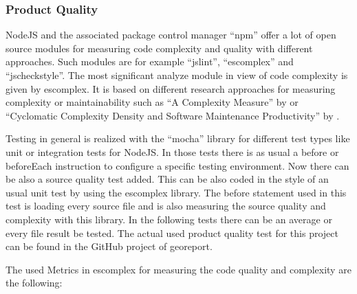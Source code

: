\documentclass[DIV=calc,paper=a4,fontsize=9pt,twocolumn]{scrartcl}
\begin{document}
\subsubsection{Product Quality}

NodeJS and the associated package control manager \enquote{npm} offer a lot of open source modules for measuring code complexity and quality with different approaches. Such modules are for example \enquote{jslint}, \enquote{escomplex} and \enquote{jscheckstyle}. The most significant analyze module in view of code complexity is given by escomplex. It is based on different research approaches for measuring complexity or maintainability such as \enquote{A Complexity Measure} by \citet{mccabe1976complexity} or \enquote{Cyclomatic Complexity Density and Software Maintenance Productivity} by \citet{gill1991cyclomatic}.

Testing in general is realized with the \enquote{mocha} library for different test types like unit or integration tests for NodeJS. In those tests there is as usual a before or beforeEach instruction to configure a specific testing environment. Now there can be also a source quality test added. This can be also coded in the style of an usual unit test by using the escomplex library. The before statement used in this test is loading every source file and is also measuring the source quality and complexity with this library. In the following tests there can be an average or every file result be tested. The actual used product quality test for this project can be found in the GitHub project of georeport.

The used Metrics in escomplex for measuring the code quality and complexity are the following:
\end{document}
